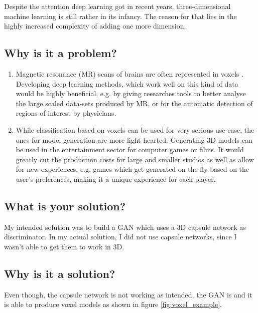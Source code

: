 \documentclass[11pt]{article}
\begin{document}
Despite the attention deep learning got in recent years, three-dimensional machine learning is still rather in its infancy. The reason for that lies in the highly increased complexity of adding one more dimension.

\subsection{Why is it a problem?}
\begin{enumerate}
	\item Magnetic resonance (MR) scans of brains are often represented in voxels \cite{chen2018b, moeskops2016}. Developing deep learning methods, which work well on this kind of data would be highly beneficial, e.g. by giving researches tools to better analyse the large scaled data-sets produced by MR, or for the automatic detection of regions of interest by physicians.
	\item While classification based on voxels can be used for very serious use-case, the ones for model generation are more light-hearted. Generating 3D models can be used in the entertainment sector for computer games or films. It would greatly cut the production costs for large and smaller studios as well as allow for new experiences, e.g. games which get generated on the fly based on the user's preferences, making it a unique experience for each player.
\end{enumerate}

\subsection{What is your solution?}
My intended solution was to build a GAN which uses a 3D capsule network as discriminator. In my actual solution, I did not use capsule networks, since I wasn't able to get them to work in 3D.

\subsection{Why is it a solution?}
Even though, the capsule network is not working as intended, the GAN is and it is able to produce voxel models as shown in figure \ref{fig:voxel_example}.
\end{document}
